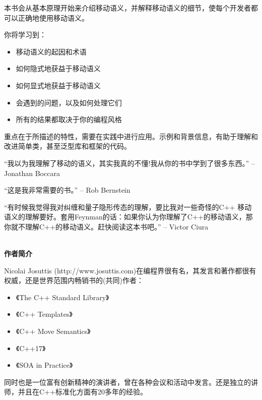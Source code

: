 \documentclass[11pt,a4paper,UTF8]{ctexart}
\begin{document}
	本书会从基本原理开始来介绍移动语义，并解释移动语义的细节，使每个开发者都可以正确地使用移动语义。\par
	
	你将学习到：\par
	
	\begin{itemize}
		\item 移动语义的起因和术语
		\item 如何隐式地获益于移动语义
		\item 如何显式地获益于移动语义
		\item 会遇到的问题，以及如何处理它们
		\item 所有的结果都取决于你的编程风格
	\end{itemize}
	
	重点在于所描述的特性，需要在实践中进行应用。示例和背景信息，有助于理解和改进简单类，甚至泛型库和框架的代码。\par
	\par
	“我以为我理解了移动的语义，其实我真的不懂!我从你的书中学到了很多东西。”	-- Jonathan Boccara\par
	
	“这是我非常需要的书。” -- Rob Bernstein\par
	
	“有时候我觉得我对纠缠和量子隐形传态的理解，要比我对一些奇怪的C++ 移动语义的理解要好。套用Feynman的话：如果你认为你理解了C++的移动语义，那你就不理解C++的移动语义。赶快阅读这本书吧。”	-- Victor Ciura\par
	
	
	\hspace*{\fill} \\ %
	\noindent\textbf{作者简介}\ \par
	Nicolai Josuttis (http://www.josuttis.com)在编程界很有名，其发言和著作都很有权威，还是世界范围内畅销书的(共同)作者：\par
	
	\begin{itemize}
		\item 《The C++ Standard Library》
		\item 《C++ Templates》
		\item 《C++ Move Semantics》
		\item 《C++17》
		\item 《SOA in Practice》
	\end{itemize}
	
	同时也是一位富有创新精神的演讲者，曾在各种会议和活动中发言。还是独立的讲师，并且在C++标准化方面有20多年的经验。\par
	
\end{document}
